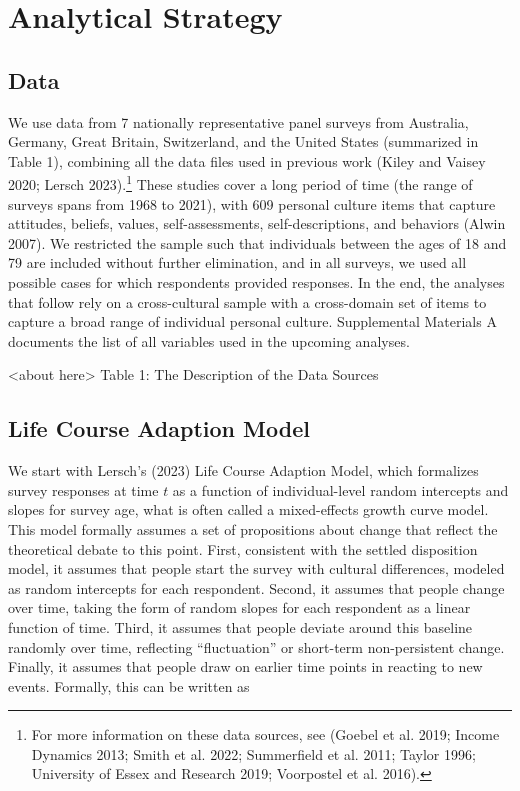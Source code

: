 \documentclass[
  12pt,
]{article}
\begin{document}
\hypertarget{analytical-strategy}{%
\section{Analytical Strategy}\label{analytical-strategy}}

\hypertarget{data}{%
\subsection{Data}\label{data}}

We use data from 7 nationally representative panel surveys from
Australia, Germany, Great Britain, Switzerland, and the United States
(summarized in Table 1), combining all the data files used in previous
work (Kiley and Vaisey 2020; Lersch 2023).\footnote{For more information
  on these data sources, see (Goebel et al. 2019; Income Dynamics 2013;
  Smith et al. 2022; Summerfield et al. 2011; Taylor 1996; University of
  Essex and Research 2019; Voorpostel et al. 2016).} These studies cover
a long period of time (the range of surveys spans from 1968 to 2021),
with 609 personal culture items that capture attitudes, beliefs, values,
self-assessments, self-descriptions, and behaviors (Alwin 2007). We
restricted the sample such that individuals between the ages of 18 and
79 are included without further elimination, and in all surveys, we used
all possible cases for which respondents provided responses. In the end,
the analyses that follow rely on a cross-cultural sample with a
cross-domain set of items to capture a broad range of individual
personal culture. Supplemental Materials A documents the list of all
variables used in the upcoming analyses.

\begin{center}
<about here> 
Table 1: The Description of the Data Sources
\end{center}

\hypertarget{life-course-adaption-model}{%
\subsection{Life Course Adaption
Model}\label{life-course-adaption-model}}

We start with Lersch's (2023) Life Course Adaption Model, which
formalizes survey responses at time \(t\) as a function of
individual-level random intercepts and slopes for survey age, what is
often called a mixed-effects growth curve model. This model formally
assumes a set of propositions about change that reflect the theoretical
debate to this point. First, consistent with the settled disposition
model, it assumes that people start the survey with cultural
differences, modeled as random intercepts for each respondent. Second,
it assumes that people change over time, taking the form of random
slopes for each respondent as a linear function of time. Third, it
assumes that people deviate around this baseline randomly over time,
reflecting ``fluctuation'' or short-term non-persistent change. Finally,
it assumes that people draw on earlier time points in reacting to new
events. Formally, this can be written as
\end{document}
